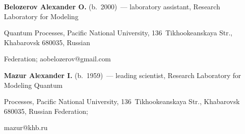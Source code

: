 \textbf{Belozerov Alexander O.} (b.\ 2000)~--- laboratory assistant, Research Laboratory for Modeling 


Quantum Processes, Pacific National University, 136~Tikhookeanskaya Str., Khabarovsk 680035, Russian 


Federation; \mbox{aobelozerov@gmail.com}





\vspace*{3pt}





\noindent


\textbf{Mazur Alexander I.} (b.\ 1959)~--- leading scientist, Research Laboratory for Modeling Quantum 


Processes, Pacific National University, 136~Tikhookeanskaya Str., Khabarovsk 680035, Russian Federation; 


\mbox{mazur@khb.ru}





\label{end\stat}





\renewcommand{\bibname}{\protect\rm Литература} 


